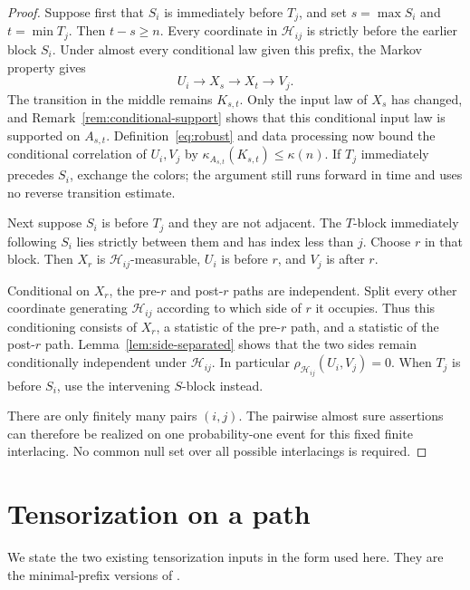 \documentclass[11pt]{amsart}
\numberwithin{equation}{section}
\theoremstyle{definition}
\newcommand{\cH}{\mathcal H}
\begin{document}
\begin{proof}
Suppose first that $S_i$ is immediately before $T_j$, and set $s=\max S_i$ and $t=\min T_j$. Then $t-s\ge n$. Every coordinate in $\cH_{ij}$ is strictly before the earlier block $S_i$. Under almost every conditional law given this prefix, the Markov property gives
\begin{equation}\label{eq:conditional-chain}
U_i\longrightarrow X_s\longrightarrow X_t\longrightarrow V_j.
\end{equation}
The transition in the middle remains $K_{s,t}$. Only the input law of $X_s$ has changed, and Remark~\ref{rem:conditional-support} shows that this conditional input law is supported on $A_{s,t}$. Definition~\eqref{eq:robust} and data processing now bound the conditional correlation of $U_i,V_j$ by $\kappa_{A_{s,t}}(K_{s,t})\le\kappa(n)$. If $T_j$ immediately precedes $S_i$, exchange the colors; the argument still runs forward in time and uses no reverse transition estimate.

Next suppose $S_i$ is before $T_j$ and they are not adjacent. The $T$-block immediately following $S_i$ lies strictly between them and has index less than $j$. Choose $r$ in that block. Then $X_r$ is $\cH_{ij}$-measurable, $U_i$ is before $r$, and $V_j$ is after $r$.

Conditional on $X_r$, the pre-$r$ and post-$r$ paths are independent. Split every other coordinate generating $\cH_{ij}$ according to which side of $r$ it occupies. Thus this conditioning consists of $X_r$, a statistic of the pre-$r$ path, and a statistic of the post-$r$ path. Lemma~\ref{lem:side-separated} shows that the two sides remain conditionally independent under $\cH_{ij}$. In particular $\rho_{\cH_{ij}}(U_i,V_j)=0$. When $T_j$ is before $S_i$, use the intervening $S$-block instead.

There are only finitely many pairs $(i,j)$. The pairwise almost sure assertions can therefore be realized on one probability-one event for this fixed finite interlacing. No common null set over all possible interlacings is required.
\end{proof}

\section{Tensorization on a path}\label{sec:tensorization}

We state the two existing tensorization inputs in the form used here. They are the minimal-prefix versions of \cite[Theorems~3.3.1 and~3.3.10, Section~3.4(a)]{Peyre2010}.
\end{document}
